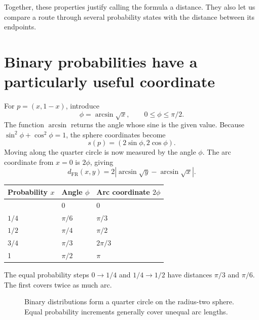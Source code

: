 \documentclass[11pt,oneside,openany]{book}
\theoremstyle{definition}
\theoremstyle{remark}
\numberwithin{equation}{chapter}
\begin{document}
Together, these properties justify calling the formula a distance. They also let us compare a route through several probability states with the distance between its endpoints.

\section{Binary probabilities have a particularly useful coordinate}\label{ch07-binary-probabilities-have-a-particularly-useful-coordinate}

For \(p=(x,1-x)\), introduce \[\phi=\arcsin\sqrt{x},\qquad 0\leq\phi\leq\pi/2.\] The function \(\arcsin\) returns the angle whose sine is the given value. Because \(\sin^2\phi+\cos^2\phi=1\), the sphere coordinates become \[s(p)=(2\sin\phi,2\cos\phi).\] Moving along the quarter circle is now measured by the angle \(\phi\). The arc coordinate from \(x=0\) is \(2\phi\), giving \[\boxed{d_{\mathrm{FR}}(x,y)
=2|\arcsin\sqrt y-\arcsin\sqrt x|.}\]

\begin{longtable}[]{@{}lll@{}}
\toprule\noalign{}
Probability \(x\) & Angle \(\phi\) & Arc coordinate \(2\phi\) \\
\midrule\noalign{}
\endhead
\bottomrule\noalign{}
\endlastfoot
0 & 0 & 0 \\
\(1/4\) & \(\pi/6\) & \(\pi/3\) \\
\(1/2\) & \(\pi/4\) & \(\pi/2\) \\
\(3/4\) & \(\pi/3\) & \(2\pi/3\) \\
1 & \(\pi/2\) & \(\pi\) \\
\end{longtable}

The equal probability steps \(0\to1/4\) and \(1/4\to1/2\) have distances \(\pi/3\) and \(\pi/6\). The first covers twice as much arc.

\begin{figure}[htbp]\centering
{}
\caption{Binary distributions form a quarter circle on the radius-two sphere. Equal probability increments generally cover unequal arc lengths.}\end{figure}
\end{document}
